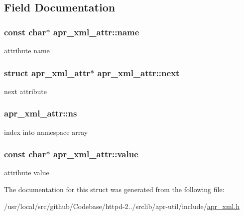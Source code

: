\subsection{Field Documentation}
\subsubsection[{\texorpdfstring{name}{name}}]{\setlength{\rightskip}{0pt plus 5cm}const char$\ast$ apr\+\_\+xml\+\_\+attr\+::name}\hypertarget{structapr__xml__attr_a2ac25d74e3fd8a521b70af15ae8c1257}{}\label{structapr__xml__attr_a2ac25d74e3fd8a521b70af15ae8c1257}
attribute name 
\subsubsection[{\texorpdfstring{next}{next}}]{\setlength{\rightskip}{0pt plus 5cm}struct {\bf apr\+\_\+xml\+\_\+attr}$\ast$ apr\+\_\+xml\+\_\+attr\+::next}\hypertarget{structapr__xml__attr_a89a314d3136128eb2a37146ddb30da4f}{}\label{structapr__xml__attr_a89a314d3136128eb2a37146ddb30da4f}
next attribute 
\subsubsection[{\texorpdfstring{ns}{ns}}]{ apr\+\_\+xml\+\_\+attr\+::ns}\hypertarget{structapr__xml__attr_ad08daf8b0b47796aae04b6aeaa332bc2}{}\label{structapr__xml__attr_ad08daf8b0b47796aae04b6aeaa332bc2}
index into namespace array 
\subsubsection[{\texorpdfstring{value}{value}}]{\setlength{\rightskip}{0pt plus 5cm}const char$\ast$ apr\+\_\+xml\+\_\+attr\+::value}\hypertarget{structapr__xml__attr_a12f0f611e426fe83704de92b3b11d2e3}{}\label{structapr__xml__attr_a12f0f611e426fe83704de92b3b11d2e3}
attribute value 

The documentation for this struct was generated from the following file\+:\begin{DoxyCompactItemize}
\item 
/usr/local/src/github/\+Codebase/httpd-\/2../srclib/apr-\/util/include/\hyperlink{apr__xml_8h}{apr\+\_\+xml.\+h}\end{DoxyCompactItemize}

